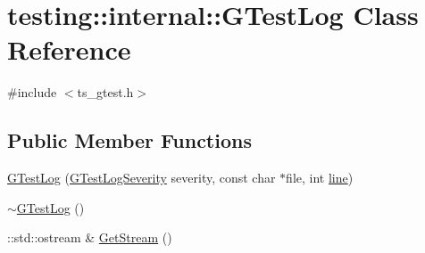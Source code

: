 \hypertarget{classtesting_1_1internal_1_1GTestLog}{\section{testing\-:\-:internal\-:\-:G\-Test\-Log Class Reference}
\label{classtesting_1_1internal_1_1GTestLog}
}


{\ttfamily \#include $<$ts\-\_\-gtest.\-h$>$}

\subsection*{Public Member Functions}
\begin{DoxyCompactItemize}
\item 
\hyperlink{classtesting_1_1internal_1_1GTestLog_a364691bf972983a59cfa2891062a64af}{G\-Test\-Log} (\hyperlink{namespacetesting_1_1internal_aa6255ef3b023c5b4e1a2198d887fb977}{G\-Test\-Log\-Severity} severity, const char $\ast$file, int \hyperlink{legacy_8hpp_a5a869825573cfaf8861a6ec0fe0f262f}{line})
\item 
\hyperlink{classtesting_1_1internal_1_1GTestLog_a978a099703bbaa0f380216e8d7ee03d3}{$\sim$\-G\-Test\-Log} ()
\item 
\-::std\-::ostream \& \hyperlink{classtesting_1_1internal_1_1GTestLog_aebb92e67d98eca69f0347d5121dab27a}{Get\-Stream} ()
\end{DoxyCompactItemize}


